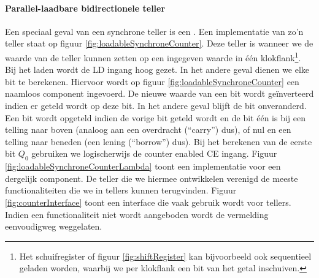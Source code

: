 \paragraph{Parallel-laadbare bidirectionele teller}
Een speciaal geval van een synchrone teller is een . Een implementatie van zo'n teller staat op figuur \ref{fig:loadableSynchroneCounter}. Deze teller is  wanneer we de waarde van de teller kunnen zetten op een ingegeven waarde in \'e\'en klokflank\footnote{Het schuifregister of figuur \ref{fig:shiftRegister} kan bijvoorbeeld ook sequentieel geladen worden, waarbij we per klokflank een bit van het getal inschuiven.}. Bij het laden wordt de LD ingang hoog gezet. In het andere geval dienen we elke bit te berekenen. Hiervoor wordt op figuur \ref{fig:loadableSynchroneCounter} een naamloos component ingevoerd. De nieuwe waarde van een bit wordt ge\"inverteerd indien er geteld wordt op deze bit. In het andere geval blijft de bit onveranderd. Een bit wordt opgeteld indien de vorige bit geteld wordt en de bit \'e\'en is bij een telling naar boven (analoog aan een overdracht (``carry'') dus), of nul en een telling naar beneden (een lening (``borrow'') dus). Bij het berekenen van de eerste bit $Q_0$ gebruiken we logischerwijs de counter enabled CE ingang. Figuur \ref{fig:loadableSynchroneCounterLambda} toont een implementatie voor een dergelijk component. De teller die we hiermee ontwikkelen verenigd de meeste functionaliteiten die we in tellers kunnen terugvinden. Figuur \ref{fig:counterInterface} toont een interface die vaak gebruik wordt voor tellers. Indien een functionaliteit niet wordt aangeboden wordt de vermelding eenvoudigweg weggelaten.
